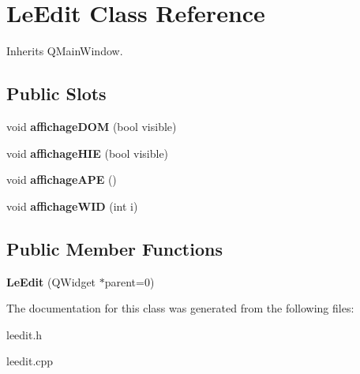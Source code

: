 \hypertarget{class_le_edit}{\section{Le\-Edit Class Reference}
\label{class_le_edit}
}


Inherits Q\-Main\-Window.

\subsection*{Public Slots}
\begin{DoxyCompactItemize}
\item 
\hypertarget{class_le_edit_a093399eb39cfb60f825ecbc6ab5ae096}{void {\bfseries affichage\-D\-O\-M} (bool visible)}\label{class_le_edit_a093399eb39cfb60f825ecbc6ab5ae096}

\item 
\hypertarget{class_le_edit_ad4ae5c310f20d825dc582f8370f9069d}{void {\bfseries affichage\-H\-I\-E} (bool visible)}\label{class_le_edit_ad4ae5c310f20d825dc582f8370f9069d}

\item 
\hypertarget{class_le_edit_afa90a24cb83a1302a4ed9dd249e996b1}{void {\bfseries affichage\-A\-P\-E} ()}\label{class_le_edit_afa90a24cb83a1302a4ed9dd249e996b1}

\item 
\hypertarget{class_le_edit_a7d6a5fccc38fb0edde64aa3572e8b44d}{void {\bfseries affichage\-W\-I\-D} (int i)}\label{class_le_edit_a7d6a5fccc38fb0edde64aa3572e8b44d}

\end{DoxyCompactItemize}
\subsection*{Public Member Functions}
\begin{DoxyCompactItemize}
\item 
\hypertarget{class_le_edit_a135617402621e814b450a731e96e02fc}{{\bfseries Le\-Edit} (Q\-Widget $\ast$parent=0)}\label{class_le_edit_a135617402621e814b450a731e96e02fc}

\end{DoxyCompactItemize}


The documentation for this class was generated from the following files\-:\begin{DoxyCompactItemize}
\item 
leedit.\-h\item 
leedit.\-cpp\end{DoxyCompactItemize}
